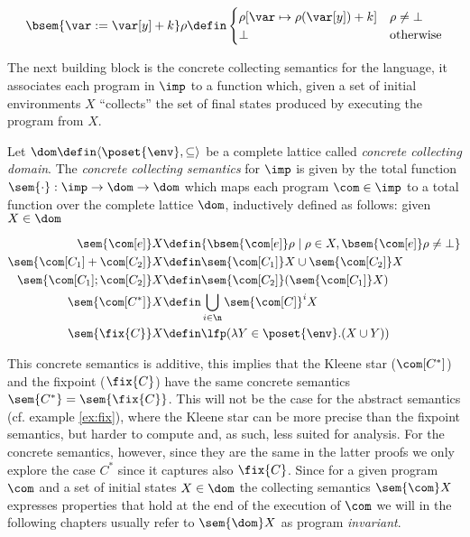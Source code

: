 \begin{definition}
\begin{align*}
    \bsem{\var:= \var[y] + k} \rho & \defin \begin{cases} \rho [\var\mapsto \rho(\var[y]) + k] & \rho \neq \bot \\ \bot & \text{otherwise}\end{cases} \\
  \end{align*}
\end{definition}

The next building block is the concrete collecting semantics for the
language, it associates each program in \(\imp\) to a function which,
given a set of initial environments \(X\) ``collects'' the set of
final states produced by executing the program from \(X\).

\begin{definition}
  Let \(\dom \defin \langle \poset{\env} , \subseteq \rangle\) be a
  complete lattice called \emph{concrete collecting domain}. The
  \emph{concrete collecting semantics} for \(\imp\) is given by the
  total function \(\sem{\cdot} : \imp \to \dom \to \dom\) which maps
  each program \(\com \in \imp\) to a total function over the complete
  lattice \(\dom\), inductively defined as follows: given
  \(X \in \dom\)

  \begin{align*}
    \sem{\com[e]} X & \defin \{\bsem{\com[e]} \rho \mid \rho \in X,
    \bsem{\com[e]} \rho \neq \bot\} \\
    \sem{\com[C_1] + \com[C_2]} X & \defin \sem{\com[C_1]} X \cup \sem{\com[C_2]} X \\
    \sem{\com[C_1] ; \com[C_2]} X & \defin \sem{\com[C_2]}(\sem{\com[C_1]} X) \\
    \sem{\com[C^*]} X & \defin \bigcup_{i \in \n} \sem{\com[C]}^i X \\
    \sem{\fix{C}} X & \defin \lfp(\lambda Y \in\poset{\env} . (X \cup Y))
  \end{align*}
\end{definition}

This concrete semantics is additive, this implies that the Kleene star
(\(\com[C^*]\)) and the fixpoint (\(\fix{C}\)) have the same concrete
semantics \(\sem{C^*} = \sem{\fix{C}}\).  This will not be the case
for the abstract semantics (cf. example \ref{ex:fix}), where the
Kleene star can be more precise than the fixpoint semantics, but
harder to compute and, as such, less suited for analysis. For the
concrete semantics, however, since they are the same in the latter
proofs we only explore the case \(C^*\) since it captures also
\(\fix{C}\). Since for a given program \(\com\) and a set of initial
states \(X \in \dom\) the collecting semantics \(\sem{\com}X\)
expresses properties that hold at the end of the execution of \(\com\)
we will in the following chapters usually refer to \(\sem{\dom}X\) as
program \emph{invariant}.

